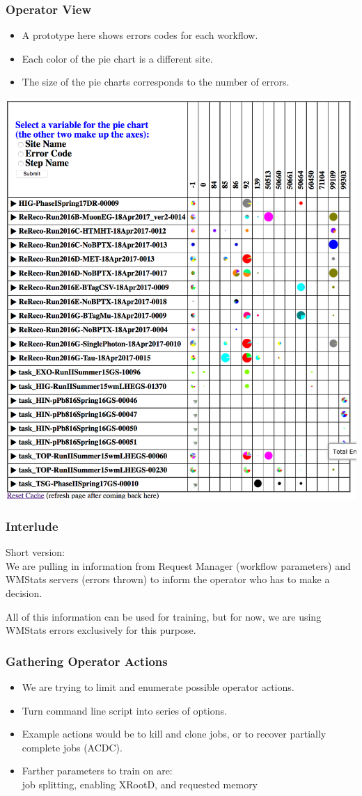 \documentclass{beamer}
\begin{document}
\begin{frame}
  \frametitle{Operator View}

  \begin{itemize}
  \item A prototype here shows errors codes for each workflow.
  \item Each color of the pie chart is a different site.
  \item The size of the pie charts corresponds to the number of errors.
  \end{itemize}

  \hspace{0.25\linewidth}
  \includegraphics[width=0.5\linewidth]{Global.png}

\end{frame}

\begin{frame}
  \frametitle{Interlude}

  Short version: \\
  We are pulling in information from Request Manager (workflow parameters)
  and WMStats servers (errors thrown) to inform the operator who has to make a decision.

  \vspace{12pt}

  All of this information can be used for training, but
  for now, we are using WMStats errors exclusively for this purpose.

\end{frame}

\begin{frame}
  \frametitle{Gathering Operator Actions}

  \begin{itemize}
  \item We are trying to limit and enumerate possible operator actions.
  \item Turn command line script into series of options.
  \item Example actions would be to kill and clone jobs,
    or to recover partially complete jobs (ACDC).
  \item Farther parameters to train on are: \\
    job splitting, enabling XRootD,  and requested memory
  \end{itemize}
\end{frame}
\end{document}
